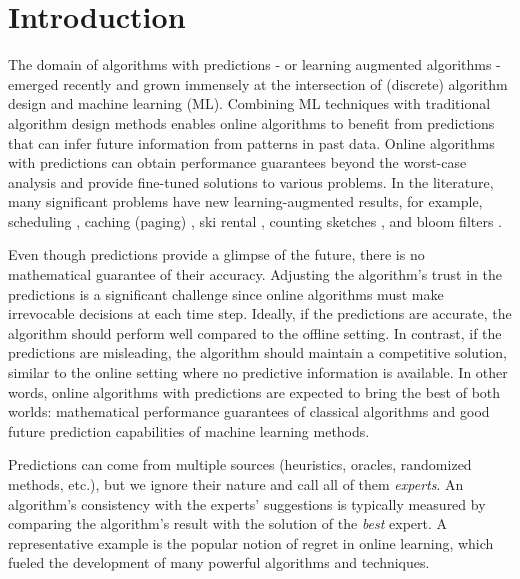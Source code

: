 
\section{Introduction}


The domain of algorithms with predictions \cite{MitzenmacherVassilvitskii20:Beyond-the-Worst-Case} - or learning augmented algorithms - emerged recently and grown immensely at the intersection of (discrete) algorithm design and machine learning (ML).
Combining ML techniques with traditional algorithm design methods enables online algorithms to benefit from predictions that can infer future information from patterns in past data. Online algorithms with predictions can obtain performance guarantees beyond the worst-case analysis and provide fine-tuned solutions to various problems. In the literature, many significant problems have new learning-augmented results, for example, scheduling \cite{LattanziLavastida20:Online-scheduling,Mitzenmacher20:Scheduling-with}, caching (paging) \cite{LykourisVassilvtiskii18:Competitive-caching,Rohatgi20:Near-optimal-bounds,AntoniadisCoester20:Online-metric}, ski rental \cite{GollapudiPanigrahi19:Online-algorithms,KumarPurohit18:Improving-online,AngelopoulosDurr20:Online-Computation}, counting sketches \cite{HsuIndyk19:Learning-Based-Frequency}, and bloom filters \cite{KraskaBeutel18:The-case-for-learned,Mitzenmacher18:A-model-for-learned}.

Even though predictions provide a glimpse of the future, there is no mathematical guarantee of their accuracy. Adjusting the algorithm's trust in the predictions is a significant challenge since online algorithms must make irrevocable decisions at each time step. Ideally, if the predictions are accurate, the algorithm should perform well compared to the offline setting. In contrast, if the predictions are misleading, the algorithm should maintain a competitive solution, similar to the online setting where no predictive information is available. In other words, online algorithms with predictions are expected to bring the best of both worlds: mathematical performance guarantees of classical algorithms and good future prediction capabilities of machine learning methods.

Predictions can come from multiple sources (heuristics, oracles, randomized methods, etc.), but we ignore their nature and call all of them \emph{experts}.  An algorithm's consistency with the experts' suggestions is typically measured by comparing the algorithm's result with the solution of the \emph{best} expert. A representative example is the popular notion of regret in online learning, which fueled the development of many powerful algorithms and techniques.

